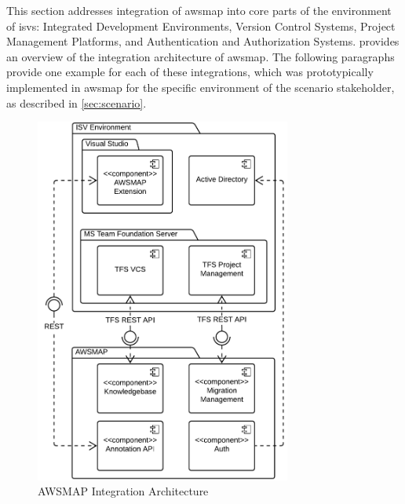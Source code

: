 This section addresses integration of \gls{awsmap} into core parts of the environment of \glspl{isv}: Integrated Development Environments, Version Control Systems, Project Management Platforms, and Authentication and Authorization Systems.
 provides an overview of the integration architecture of \gls{awsmap}.
The following paragraphs provide one example for each of these integrations, which was prototypically implemented in \gls{awsmap} for the specific environment of the scenario stakeholder, as described in \cref{sec:scenario}.
\begin{figure}[h!]
\hypertarget{fig:awsmap.integration}{%
\centering
\includegraphics[width=0.75\textwidth]{../figures/awsmap-integration-NOFONTS.pdf}
\caption{AWSMAP Integration Architecture}\label{fig:awsmap.integration}
}
\end{figure}


